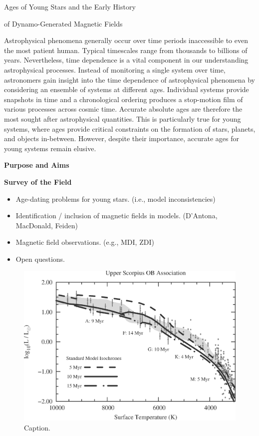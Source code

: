 \documentclass[12pt,a4paper]{article}
\begin{document}
\begin{center}
	{\bf {\LARGE Ages of Young Stars and the Early History
	
	of Dynamo-Generated Magnetic Fields}} 
\end{center}

Astrophysical phenomena generally occur over time periods inaccessible to even the most patient human. Typical timescales range from thousands to billions of years. Nevertheless, time dependence is a vital component in our understanding astrophysical processes. 
Instead of monitoring a single system over time, astronomers gain insight into the time dependence of astrophysical phenomena by considering an ensemble of systems at different ages. Individual systems provide snapshots in time and a chronological ordering produces a stop-motion film of various processes across cosmic time. Accurate absolute ages are therefore the most sought after astrophysical quantities. This is particularly true for young systems, where ages provide critical constraints on the formation of stars, planets, and objects in-between. However, despite their importance, accurate ages for young systems remain elusive.

\vspace{\baselineskip}

{\bf \large Purpose and Aims}

\clearpage

{\bf \large Survey of the Field}
\begin{itemize}
	\item Age-dating problems for young stars. (i.e., model inconsistencies)
	\item Identification / inclusion of magnetic fields in models. (D'Antona, MacDonald, Feiden)
	\item Magnetic field observations. (e.g., MDI, ZDI)
	\item Open questions.
\end{itemize}

\begin{figure}
	\centering
	\includegraphics[width=0.75\linewidth]{./fig/USco_Age_Problems.eps}
	\caption{Caption.}
	\label{fig:probs}
\end{figure}
\end{document}

